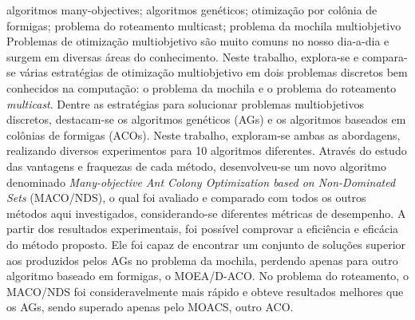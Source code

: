\documentclass[dissertmst]{ppgco}
\begin{document}
\begin{resumo}{algoritmos many-objectives; algoritmos genéticos; otimização por colônia de formigas; problema do roteamento multicast; problema da mochila multiobjetivo}
	Problemas de otimização multiobjetivo são muito comuns no nosso dia-a-dia e surgem em diversas áreas do conhecimento. Neste trabalho, explora-se e compara-se várias estratégias de otimização multiobjetivo em dois problemas discretos bem conhecidos na computação: o problema da mochila e o problema do roteamento \textit{multicast}. Dentre as estratégias para solucionar problemas multiobjetivos discretos, destacam-se os algoritmos genéticos (AGs) e os algoritmos baseados em colônias de formigas (ACOs). Neste trabalho, exploram-se ambas as abordagens, realizando diversos experimentos para 10 algoritmos diferentes. Através do estudo das vantagens e fraquezas de cada método, desenvolveu-se um novo algoritmo denominado \textit{Many-objective Ant Colony Optimization based on Non-Dominated Sets} (MACO/NDS), o qual foi avaliado e comparado com todos os outros métodos aqui investigados, considerando-se diferentes métricas de desempenho. A partir dos resultados experimentais, foi possível comprovar a eficiência e eficácia do método proposto. Ele foi capaz de encontrar um conjunto de soluções superior aos produzidos pelos AGs no problema da mochila, perdendo apenas para outro algoritmo baseado em formigas, o MOEA/D-ACO. No problema do roteamento, o MACO/NDS foi consideravelmente mais rápido e obteve resultados melhores que os AGs, sendo superado apenas pelo MOACS, outro ACO.
\end{resumo}

\begin{abstract}{many-objective algorithms; genetic algorithms; ant colony optimization; multicast routing problem; multi-objective knapsack problem}
	Multi-objective optimization problems are very common in the day-to-day life and come up in many fields of knowledge. In this work, several strategies for multi-objective optimization have been explored and compared in two well known discrete problems in computer science: the knapsack problem and the multicast routing problem. Among all strategies to solve multi-objective discrete problems, genetic algorithms (GAs) and ant colony optimization (ACO) are the ones who generally provide the best results. In this work both approaches are explored through several experiments involving 10 different algorithms. As a consequence of studying the strengths and weaknesses of each method, a new algorithm has been proposed, the Many-objective Ant Colony Optimization based on Non-Dominated Sets (MACO/NDS), which has been evaluated and compared against all other methods investigated here, considering different performance metrics. It has been capable of finding superior sets of solutions than the ones yielded by the GAs in the knapsack problem, losing only to another algorithm based on ant colonies, the MOEA/D-ACO. In the routing problem, MACO/NDS was considerably faster and obtained better results than any GA, being surpassed only by MOACS, another ACO.
\end{abstract}
\end{document}
